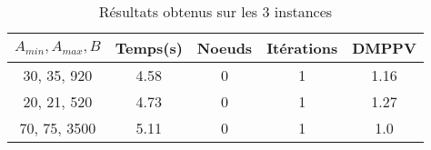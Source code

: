 \documentclass[main.tex]{subfiles}
\begin{document}
\thispagestyle{empty}

\begin{table}
    \centering
    \caption{Résultats obtenus sur les 3 instances}
    \begin{tabular}{
    ccccc}
\hline	
	\textbf{$A_{min}, A_{max}, B$} &\textbf{Temps(s)} &\textbf{Noeuds} &\textbf{Itérations} &\textbf{DMPPV}\\
	\hline

	

	
30, 35, 920 &4.58 &0 &1 &1.16\\
20, 21, 520 &4.73 &0 &1 &1.27\\
70, 75, 3500 &5.11 &0 &1 &1.0\\
    \end{tabular}
\end{table}
\end{document}
